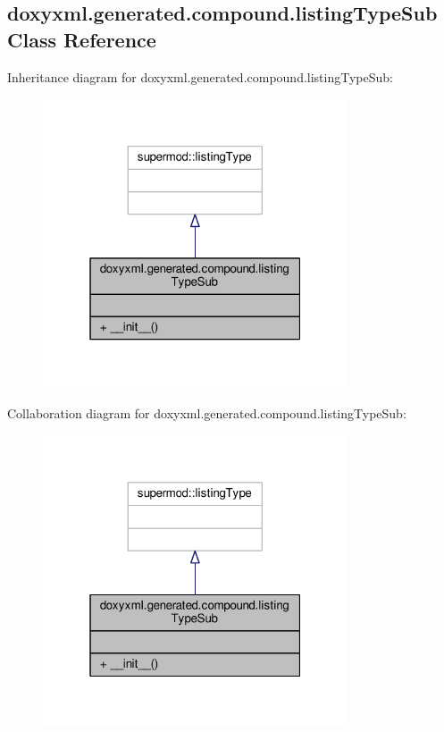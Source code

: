 \subsection{doxyxml.\+generated.\+compound.\+listing\+Type\+Sub Class Reference}
\label{classdoxyxml_1_1generated_1_1compound_1_1listingTypeSub}


Inheritance diagram for doxyxml.\+generated.\+compound.\+listing\+Type\+Sub\+:
\nopagebreak
\begin{figure}[H]
\begin{center}
\leavevmode
\includegraphics[width=256pt]{dd/d80/classdoxyxml_1_1generated_1_1compound_1_1listingTypeSub__inherit__graph}
\end{center}
\end{figure}


Collaboration diagram for doxyxml.\+generated.\+compound.\+listing\+Type\+Sub\+:
\nopagebreak
\begin{figure}[H]
\begin{center}
\leavevmode
\includegraphics[width=256pt]{d2/d78/classdoxyxml_1_1generated_1_1compound_1_1listingTypeSub__coll__graph}
\end{center}
\end{figure}
